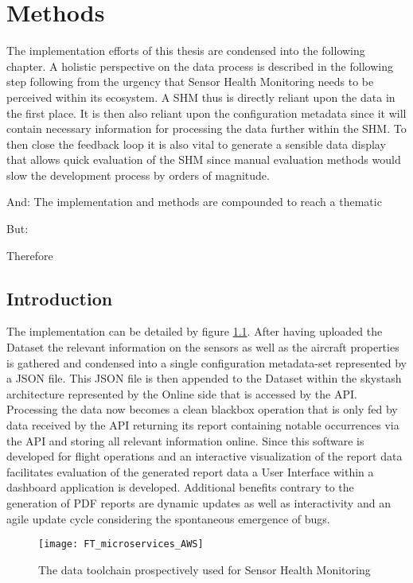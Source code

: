 \chapter{Methods}

The implementation efforts of this thesis are condensed into the following chapter. A holistic perspective on the data process is described in the following step following from the urgency that Sensor Health Monitoring needs to be perceived within its ecosystem. A SHM thus is directly reliant upon the data in the first place. It is then also reliant upon the configuration metadata since it will contain necessary information for processing the data further within the SHM. To then close the feedback loop it is also vital to generate a sensible data display that allows quick evaluation of the SHM since manual evaluation methods would slow the development process by orders of magnitude.

And: The implementation and methods are compounded to reach a thematic

But:


Therefore


\section{Introduction}


The implementation can be detailed by figure \ref{fig:fti_microservices}. After having uploaded the Dataset the relevant information on the sensors as well as the aircraft properties is gathered and condensed into a single configuration metadata-set represented by a JSON file. This JSON file is then appended to the Dataset within the skystash architecture represented by the Online side that is accessed by the API. Processing the data now becomes a clean blackbox operation that is only fed by data received by the API returning its report containing notable occurrences via the API and storing all relevant information online. Since this software is developed for flight operations and an interactive visualization of the report data facilitates evaluation of the generated report data a User Interface within a dashboard application is developed. Additional benefits contrary to the generation of PDF reports are dynamic updates as well as interactivity and an agile update cycle considering the spontaneous emergence of bugs.


\begin{figure}[h]
    \centering
    \texttt{[image: FT\_microservices\_AWS]}
    \caption{The data toolchain prospectively used for Sensor Health Monitoring}
    \label{fig:fti_microservices}
\end{figure}


